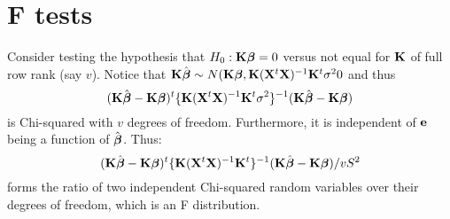 \section{F tests}
Consider testing the hypothesis that $H_0:\bK \bbeta = 0$ versus not equal for $\bK$
of full row rank (say $v$). 
Notice that $\bK \hat \bbeta \sim N(\bK \bbeta, \bK \xtxinv \bK^t \sigma^20$ and thus
$$
(\bK \hat \bbeta - \bK \bbeta)^t  \{\bK \xtxinv \bK^t \sigma^2 \}^{-1} (\bK \hat \bbeta - \bK \bbeta)
$$
is Chi-squared with $v$ degrees of freedom. Furthermore, it is independent of
$\be$ being a function of $\hat \bbeta$. Thus:
$$
(\bK \hat \bbeta - \bK \bbeta)^t  \{\bK \xtxinv \bK^t\}^{-1} (\bK \hat \bbeta - \bK \bbeta) / v S^2
$$
forms the ratio of two independent Chi-squared random variables over their degrees of freedom, which is an F distribution.



